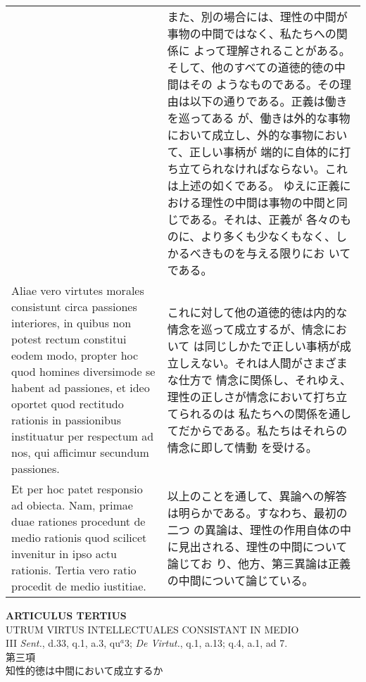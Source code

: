 \documentclass[10pt]{jsarticle}
\begin{document}
\begin{longtable}{p{21em}p{21em}}
&

 また、別の場合には、理性の中間が事物の中間ではなく、私たちへの関係に
 よって理解されることがある。そして、他のすべての道徳的徳の中間はその
 ようなものである。その理由は以下の通りである。正義は働きを巡ってある
 が、働きは外的な事物において成立し、外的な事物において、正しい事柄が
 端的に自体的に打ち立てられなければならない。これは上述の如くである。
 ゆえに正義における理性の中間は事物の中間と同じである。それは、正義が
 各々のものに、より多くも少なくもなく、しかるべきものを与える限りにお
 いてである。

\\

 Aliae vero virtutes morales consistunt circa passiones interiores, in
 quibus non potest rectum constitui eodem modo, propter hoc quod
 homines diversimode se habent ad passiones, et ideo oportet quod
 rectitudo rationis in passionibus instituatur per respectum ad nos,
 qui afficimur secundum passiones.


&

 これに対して他の道徳的徳は内的な情念を巡って成立するが、情念において
 は同じしかたで正しい事柄が成立しえない。それは人間がさまざまな仕方で
 情念に関係し、それゆえ、理性の正しさが情念において打ち立てられるのは
 私たちへの関係を通してだからである。私たちはそれらの情念に即して情動
 を受ける。

\\

Et per hoc patet responsio ad obiecta. Nam, primae duae rationes
procedunt de medio rationis quod scilicet invenitur in ipso actu
rationis. Tertia vero ratio procedit de medio iustitiae.


&

 以上のことを通して、異論への解答は明らかである。すなわち、最初の二つ
 の異論は、理性の作用自体の中に見出される、理性の中間について論じてお
 り、他方、第三異論は正義の中間について論じている。

\\

\end{longtable}
\newpage





\begin{center}
{\Large {\bf ARTICULUS TERTIUS}}\\
{\large UTRUM VIRTUS INTELLECTUALES CONSISTANT IN MEDIO}\\
{\footnotesize III {\itshape Sent.}, d.33, q.1, a.3, qu$^{a}$3; {\itshape De Virtut.}, q.1, a.13; q.4, a.1, ad 7.}\\
{\Large 第三項\\知性的徳は中間において成立するか}
\end{center}
\end{document}
